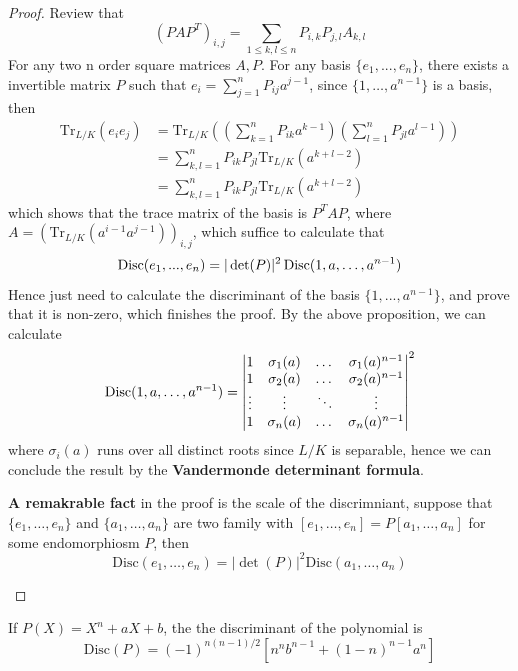 \begin{proof}
  Review that 
  \[(PAP^T)_{i,j}  = \sum_{1\leq k,l \leq n}P_{i,k}P_{j,l}A_{k,l}\]
  For any two n order square matrices \(A,P\).
  For any basis \(\{e_1,...,e_n\}\), there exists a invertible matrix \(P\) such that \(e_i = \sum_{j=1}^n P_{ij} a^{j-1}\), since \(\{1,\dots,a^{n-1}\}\) is a basis, then 
  \begin{align*}
    \mathrm{Tr}_{L/K}(e_ie_j) &= \mathrm{Tr}_{L/K}\left(\left(\sum_{k=1}^n P_{ik} a^{k-1}\right)\left(\sum_{l=1}^n P_{jl} a^{l-1}\right)\right) \\
    &= \sum_{k,l=1}^n P_{ik}P_{jl}\mathrm{Tr}_{L/K}(a^{k+l-2}) \\
    &= \sum_{k,l=1}^n P_{ik}P_{jl}\mathrm{Tr}_{L/K}(a^{k+l-2})
  \end{align*}
  which shows that the trace matrix of the basis is \(P^T A P\), where \(A = (\mathrm{Tr}_{L/K}(a^{i-1}a^{j-1}))_{i,j}\), which suffice to calculate that
  \[\operatorname{Disc}(e_1,...,e_n) = |\det(P)|^2 \operatorname{Disc}(1,a,\dots,a^{n-1}) \]
  Hence just need to calculate the discriminant of the basis \(\{1,...,a^{n-1}\}\), and prove that it is non-zero, which finishes the proof. By the above proposition, we can calculate
  \[\operatorname{Disc}(1,a,\dots,a^{n-1}) = \begin{vmatrix}
    1 & \sigma_1(a) & \dots & \sigma_1(a)^{n-1} \\
    1 & \sigma_2(a) & \dots & \sigma_2(a)^{n-1} \\
    \vdots & \vdots & \ddots & \vdots \\ 
    1 & \sigma_n(a) & \dots & \sigma_n(a)^{n-1}
  \end{vmatrix}^2\]
  where \(\sigma_i(a)\) runs over all distinct roots since \(L/K\) is separable, hence we can conclude the result by the \textbf{Vandermonde determinant formula}.

  \begin{remark}
    \textbf{A remakrable fact} in the proof is the scale of the discrimniant, suppose that \(\{e_1,\dots,e_n\}\) and \(\{a_1,\dots,a_n\}\) are two family with \([e_1,\dots,e_n] = P[a_1,\dots,a_n]\) for some endomorphiosm \(P\), then 
    \[\mathrm{Disc}(e_1,\dots,e_n) = |\det(P)|^2 \mathrm{Disc}(a_1,\dots,a_n)\]
  \end{remark}

\end{proof}

\begin{example}
    If \(P(X) = X^n+aX+b\), the the discriminant of the polynomial is 
    \[\mathrm{Disc}(P) = (-1)^{n(n-1)/2}[n^nb^{n-1} + (1-n)^{n-1}a^n]\]
\end{example}

